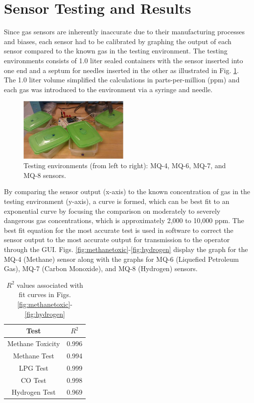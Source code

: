 \section{Sensor Testing and Results}\label{sec:results}

Since gas sensors are inherently inaccurate due to their manufacturing processes and biases, each sensor had to be calibrated by graphing the output of each sensor compared to the known gas in the testing environment. The testing environments consists of 1.0 liter sealed containers with the sensor inserted into one end and a septum for needles inserted in the other as illustrated in Fig. \ref{fig:sensor}. The 1.0 liter volume simplified the calculations in parts-per-million (ppm) and each gas was introduced to the environment via a syringe and needle.

\begin{figure}
	\centering
	\includegraphics[width=0.48\textwidth]{./pictures/sensor.jpg}
	\caption{Testing environments (from left to right): MQ-4, MQ-6, MQ-7, and MQ-8 sensors.}
	\label{fig:sensor}
\end{figure}

By comparing the sensor output (x-axis) to the known concentration of gas in the testing environment (y-axis), a curve is formed, which can be best fit to an exponential curve by focusing the comparison on moderately to severely dangerous gas concentrations, which is approximately 2,000 to 10,000 ppm. The best fit equation for the most accurate test is used in software to correct the sensor output to the most accurate output for transmission to the operator through the GUI. Figs. \ref{fig:methanetoxic}-\ref{fig:hydrogen} display the graph for the MQ-4 (Methane) sensor along with the graphs for MQ-6 (Liquefied Petroleum Gas), MQ-7 (Carbon Monoxide), and MQ-8 (Hydrogen) sensors.

\begin{table}
	\centering
	\begin{tabular}{|c||c|}
		\hline
		Test & \(R^2\) \\ \hline \hline
		Methane Toxicity & 0.996 \\ \hline
		Methane Test & 0.994 \\ \hline
		LPG Test & 0.999 \\ \hline
		CO Test & 0.998 \\ \hline
		Hydrogen Test & 0.969 \\ \hline
	\end{tabular}
	\caption{\(R^2\) values associated with fit curves in Figs. \ref{fig:methanetoxic}-\ref{fig:hydrogen}}
\end{table}

